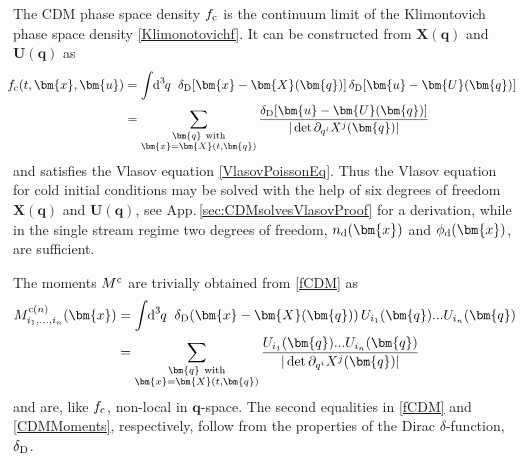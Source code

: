 \documentclass[twocolumn, nofootinbib, showpacs, superscriptaddress]{revtex4-1}
\renewcommand{\d}[0]{{\rm{d}}}
\renewcommand{\c}[0]{{\rm{c}}}
\newcommand{\vol}[2]{\hspace{-0.8mm}\mbox{$\text{d}^{\hspace{-0.0mm}#1}$}\hspace{-0.2mm}#2\hspace{0.8mm}\ }
\newcommand{\vx}[0]{\bm{x} }
\newcommand{\vX}[0]{\bm{X} }
\newcommand{\vq}[0]{\bm{q} }
\newcommand{\vu}[0]{\bm{u} }
\newcommand{\vU}[0]{\bm{U} }
\begin{document}
The CDM phase space density $f_{\rm c}$ is the continuum limit of the Klimontovich phase space density \eqref{Klimonotovichf}. It
 can be constructed from $\vX(\vq)$ and ${\vU}(\vq)$ as
\begin{subequations}  \label{fCDM}
\begin{align}
\!\!\!f_{\rm c} (t,\vx,\vu)
&= \int \vol{3}{q} \delta_{\rm{D}} [\vx - \vX(\vq)] \, \delta_{\rm{D}} [\vu - \vU(\vq)] 
\label{fCDMqspace} 
\\
&=\sum_{\substack{\vq~\mathrm{with}\\ \vx=\vX(t,\vq)}} \frac{ \delta_{\rm{D}} [\vu - \vU(\vq)]}{|\det \partial_{q^i} X^j(\vq)|}  
 \label{fCDMstreams}
\end{align}
\end{subequations}
and satisfies the Vlasov equation \eqref{VlasovPoissonEq}. 
Thus the Vlasov equation for cold initial conditions may be solved with the help of six degrees of freedom $\vX(\vq)$ and ${\vU}(\vq)$, see  App.\,\ref{sec:CDMsolvesVlasovProof} for a derivation, while in the single stream regime  two degrees of freedom, $n_\d(\vx)$ and $\phi_\d(\vx)$, are sufficient. 

The moments $M^{\c}$ are trivially obtained from \eqref{fCDM} as
\begin{subequations}   \label{CDMMoments}
\begin{align}
M^{\mathrm{c} (n)}_{i_1,...,i_n}(\vx) 
&= \int \vol{3}{q} \delta_{\rm{D}} (\vx - \vX(\vq))\, U_{i_1}(\vq) ... U_{i_n}(\vq) 
\label{CDMMomentsqspace} 
\\
&=\sum_{\substack{\vq~\mathrm{with}\\ \vx=\vX(t,\vq)}} \frac{U_{i_1}(\vq) ... U_{i_n}(\vq)}{|\det \partial_{q^i} X^j(\vq)|} 
 \label{CDMMomentsstreams}
\end{align} 
\end{subequations}
and are, like $f_{\rm c}$, non-local in $\vq$-space. The second equalities in \eqref{fCDM} and \eqref{CDMMoments}, respectively, follow from the properties of the Dirac $\delta$-function, $\delta_{\rm D}$.
\end{document}
